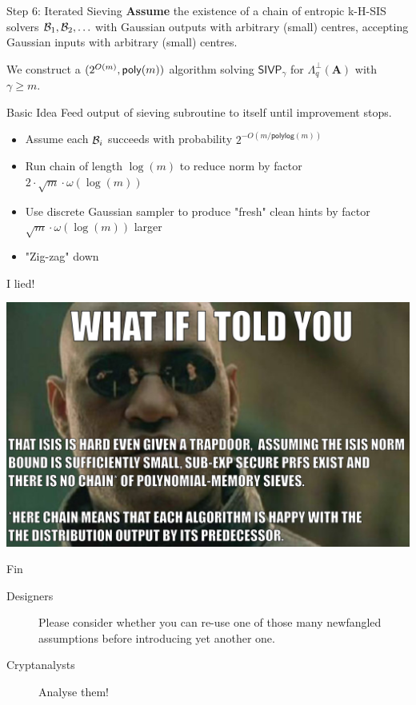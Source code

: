\documentclass[xcolor=table,10pt,aspectratio=169]{beamer}
\renewcommand{\vec}[1]{\ensuremath{\mathbf{#1}}\xspace}
\providecommand{\mat}[1]{\ensuremath{\vec{#1}}\xspace}
\newcommand{\SIVP}{\ensuremath{\mathsf{SIVP}}\xspace}
\begin{document}
\begin{frame}[label={sec:org3249564}]{Step 6: Iterated Sieving}
\textbf{Assume} the existence of a chain of entropic k-H-SIS solvers \(\mathcal{B}_1, \mathcal{B}_2, \ldots\) with Gaussian outputs with arbitrary (small) centres, accepting Gaussian inputs with arbitrary (small) centres.

We construct a \((2^{O(m)}, \poly[m])\) algorithm solving \(\SIVP_\gamma\) for \(\Lambda_q^\bot(\mat{A})\) with \(\gamma \geq m\).

\begin{block}{Basic Idea}
Feed output of sieving subroutine to itself until improvement stops.
\end{block}

\begin{itemize}
\item Assume each \(\mathcal{B}_{i}\) succeeds with probability \(2^{-O(m/\mathsf{polylog}(m))}\)
\item Run chain of length \(\log(m)\) to reduce norm by factor \(2 \cdot \sqrt{m} \cdot \omega(\log(m))\)
\item Use discrete Gaussian sampler to produce "fresh" clean hints by factor \(\sqrt{m} \cdot \omega(\log(m))\) larger
\item "Zig-zag" down
\end{itemize}
\end{frame}

\begin{frame}[label={sec:orgf77b6aa}]{I lied!}
\begin{center}
\includegraphics[keepaspectratio,height=.9\textheight]{./sis-with-hints-real.jpg}
\end{center}
\end{frame}

\begin{frame}[label={sec:org520cccf},standout]{Fin}
\begin{center}
\huge

\begin{description}
\item[{Designers}] Please consider whether you can re-use one of those many newfangled assumptions before introducing yet another one.

\item[{Cryptanalysts}] Analyse them!
\end{description}
\end{center}
\end{frame}
\end{document}
